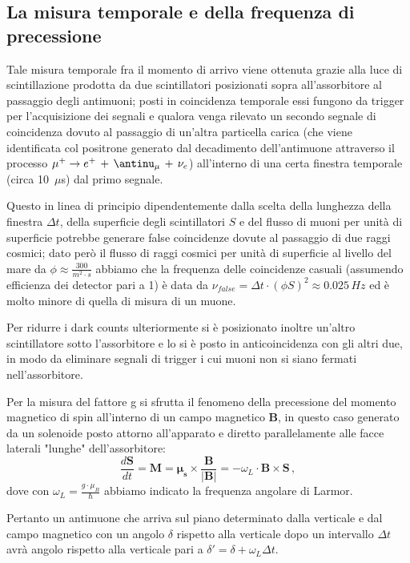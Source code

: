 \subsection{La misura temporale e della frequenza di precessione}
Tale misura temporale fra il momento di arrivo viene ottenuta grazie alla luce di scintillazione prodotta da due scintillatori posizionati sopra all'assorbitore al passaggio degli antimuoni; posti in coincidenza temporale essi fungono da trigger per l'acquisizione dei segnali e qualora venga rilevato un secondo segnale di coincidenza dovuto al passaggio di un'altra particella carica (che viene identificata col positrone generato dal decadimento dell'antimuone attraverso il processo $\mu^+ \to e^+ \, + \, \antinu_{\mu} \, + \, \nu_e$) all'interno di una certa finestra temporale (circa 10~$\mu$s) dal primo segnale. \par
Questo in linea di principio dipendentemente dalla scelta della lunghezza della finestra $\Delta t$, della superficie degli scintillatori $S$ e del flusso di muoni per unità di superficie potrebbe generare false coincidenze dovute al passaggio di due raggi cosmici; dato però il flusso di raggi cosmici per unità di superficie al livello del mare da $\phi \approx\frac{300}{m^2 \cdot s}$ \cite{bib:Patrignani:2016xqp} abbiamo che la frequenza delle coincidenze casuali (assumendo efficienza dei detector pari a 1) è data da $\nu_{false}=\Delta t \cdot (\phi S)^2 \approx 0.025 \, Hz$ ed è molto minore di quella di misura di un muone. \par
Per ridurre i dark counts ulteriormente si è posizionato inoltre un'altro scintillatore sotto l'assorbitore e lo si è posto in anticoincidenza con gli altri due, in modo da eliminare segnali di trigger i cui muoni non si siano fermati nell'assorbitore. \par
Per la misura del fattore g si sfrutta il fenomeno della precessione del momento magnetico di spin all'interno di un campo magnetico $\mathbf{B}$, in questo caso generato da un solenoide posto attorno all'apparato e diretto parallelamente alle facce laterali "lunghe" dell'assorbitore:
\begin{equation}
	\frac{d\mathbf{S}}{dt}=\mathbf{M}=\bm{\mu_s}\times\frac{\mathbf{B}}{|\mathbf{B}|}=-\omega_L \cdot \mathbf{B}\times\mathbf{S} \, ,
	\label{eq:dSdt}
\end{equation}
dove con $\omega_L=\frac{g \cdot \mu_B}{\hbar}$ abbiamo indicato la frequenza angolare di Larmor. \par
Pertanto un antimuone che arriva sul piano determinato dalla verticale e dal campo magnetico con un angolo $\delta$ rispetto alla verticale dopo un intervallo $\Delta t$ avrà angolo rispetto alla verticale pari a $\delta '=\delta + \omega_L \Delta t$. \par
